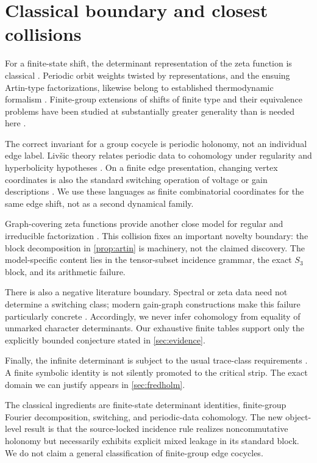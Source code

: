 \section{Classical boundary and closest collisions}
\label{sec:boundary}

For a finite-state shift, the determinant representation of the zeta
function is classical \citep{BowenLanford1970ShiftZeta}.  Periodic orbit
weights twisted by representations, and the ensuing Artin-type
factorizations, likewise belong to established thermodynamic formalism
\citep{AdachiSunada1987TwistedPF,ParryPollicott1990Zeta,Pollicott1994TwistedOrbits}.
Finite-group extensions of shifts of finite type and their equivalence
problems have been studied at substantially greater generality than is
needed here \citep{BoyleSchmieding2017FiniteExtensions}.

The correct invariant for a group cocycle is periodic holonomy, not an
individual edge label.  Livšic theory relates periodic data to cohomology
under regularity and hyperbolicity hypotheses
\citep{Livsic1972Cohomology,ParryPollicott1997Livsic,Kalinin2011MatrixLivsic}.
On a finite edge presentation, changing vertex coordinates is also the
standard switching operation of voltage or gain descriptions
\citep{GrossTucker1977Voltage,Zaslavsky1989Gain}.  We use these languages as
finite combinatorial coordinates for the same edge shift, not as a second
dynamical family.

Graph-covering zeta functions provide another close model for regular and
irreducible factorization \citep{StarkTerras1996GraphCoverings,StarkTerras2000GraphCoveringsII}.
This collision fixes an important novelty boundary: the block decomposition
in \cref{prop:artin} is machinery, not the claimed discovery.  The
model-specific content lies in the tensor-subset incidence grammar, the
exact $S_3$ block, and its arithmetic failure.

There is also a negative literature boundary.  Spectral or zeta data need
not determine a switching class; modern gain-graph constructions make this
failure particularly concrete
\citep{CavaleriDonno2022Cospectral,AbiadBelardoKhramova2024Gain,CavaleriDonnoSpessato2025Gain}.
Accordingly, we never infer cohomology from equality of unmarked character
determinants.  Our exhaustive finite tables support only the explicitly
bounded conjecture stated in \cref{sec:evidence}.

Finally, the infinite determinant is subject to the usual trace-class
requirements \citep{Simon1977InfiniteDeterminants}.  A finite symbolic
identity is not silently promoted to the critical strip.  The exact domain
we can justify appears in \cref{sec:fredholm}.

\begin{remark}
The classical ingredients are finite-state determinant identities,
finite-group Fourier decomposition, switching, and periodic-data
cohomology.  The new object-level result is that the source-locked incidence
rule realizes noncommutative holonomy but necessarily exhibits explicit
mixed leakage in its standard block.  We do not claim a general
classification of finite-group edge cocycles.
\end{remark}
